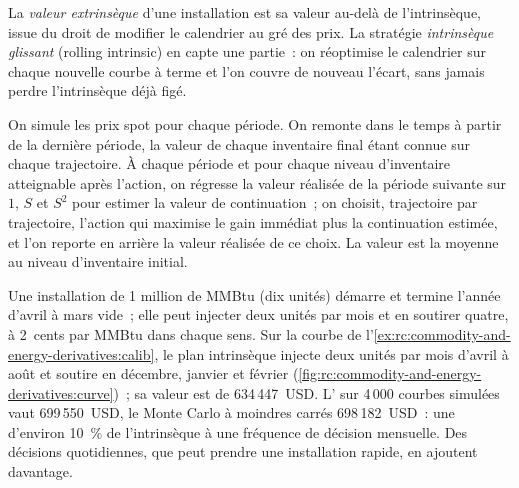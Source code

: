 \begin{definition}\label{def:rc:commodity-and-energy-derivatives:extrinsic}
La \emph{valeur extrinsèque} d'une installation est sa valeur au-delà de
l'intrinsèque, issue du droit de modifier le calendrier au gré des prix. La stratégie
\emph{intrinsèque glissant} (rolling intrinsic) en capte une partie~: on réoptimise le calendrier
sur chaque nouvelle courbe à terme et l'on couvre de nouveau l'écart, sans jamais perdre l'intrinsèque déjà
figé.
\end{definition}

\begin{method}\label{met:rc:commodity-and-energy-derivatives:lsm}
On simule les prix spot pour chaque période. On remonte dans le temps à partir de la dernière période, la valeur
de chaque inventaire final étant connue sur chaque trajectoire. À chaque période et pour chaque niveau d'inventaire
atteignable après l'action, on régresse la valeur réalisée de la période suivante sur $1$, $S$ et $S^2$
pour estimer la valeur de continuation~; on choisit, trajectoire par trajectoire, l'action qui maximise le gain
immédiat plus la continuation estimée, et l'on reporte en arrière la valeur réalisée de ce choix. La
valeur est la moyenne au niveau d'inventaire initial.
\end{method}

\label{lst:rc:commodity-and-energy-derivatives:lsm}

\begin{example}\label{ex:rc:commodity-and-energy-derivatives:storage}
Une installation de 1 million de MMBtu (dix unités) démarre et termine l'année d'avril à mars vide~; elle
peut injecter deux unités par mois et en soutirer quatre, à 2~cents par MMBtu dans chaque sens. Sur la courbe de
l'\cref{ex:rc:commodity-and-energy-derivatives:calib}, le plan intrinsèque injecte
deux unités par mois d'avril à août et soutire en décembre, janvier et février
(\cref{fig:rc:commodity-and-energy-derivatives:curve})~; sa valeur est de 634\,447~USD. L'
sur 4\,000 courbes simulées vaut 699\,550~USD, le Monte Carlo à moindres carrés
698\,182~USD~: une  d'environ 10~\% de l'intrinsèque à une
fréquence de décision mensuelle. Des décisions quotidiennes, que peut prendre une installation rapide, en ajoutent davantage.
\end{example}

